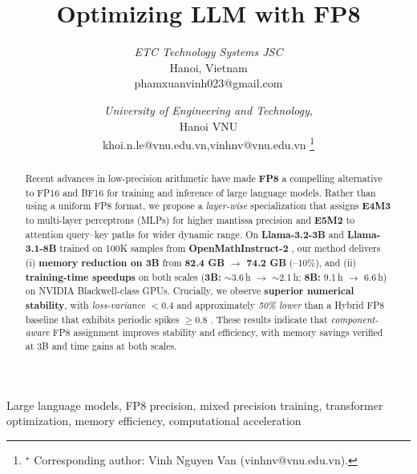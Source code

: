 \documentclass[conference]{IEEEtran}
\begin{document}
\title{Optimizing LLM with FP8}

\author{
\textit{ETC Technology Systems JSC}\\
Hanoi, Vietnam \\
phamxuanvinh023@gmail.com
\and
{}
\textit{University of Engineering and Technology, }\\
Hanoi VNU\\
khoi.n.le@vnu.edu.vn,vinhnv@vnu.edu.vn
\thanks{$^\star$ Corresponding author: Vinh Nguyen Van (vinhnv@vnu.edu.vn).}
}


\maketitle

\begin{abstract}
Recent advances in low-precision arithmetic have made \textbf{FP8} \cite{micikevicius2022fp8formatsdeeplearning} a compelling alternative to FP16 and BF16 for training and inference of large language models. Rather than using a uniform FP8 format, we propose a \emph{layer-wise} specialization that assigns \textbf{E4M3} to multi-layer perceptrons (MLPs) for higher mantissa precision and \textbf{E5M2} to attention query–key paths for wider dynamic range. On \textbf{Llama-3.2-3B} and \textbf{Llama-3.1-8B} trained on 100K samples from \textbf{OpenMathInstruct-2} \cite{toshniwal2024openmath2}, our method delivers (i) \textbf{memory reduction on 3B} from \textbf{82.4 GB $\to$ 74.2 GB} (–10\%), and (ii) \textbf{training-time speedups} on both scales (\textbf{3B:} $\sim$3.6\,h $\to$ $\sim$2.1\,h; \textbf{8B:} 9.1\,h $\to$ 6.6\,h) on NVIDIA Blackwell-class GPUs. Crucially, we observe \textbf{superior numerical stability}, with \emph{loss-variance $< 0.4$} and approximately \emph{50\% lower} than a Hybrid FP8 baseline that exhibits periodic spikes $\ge 0.8$ \cite{TE2025,nvidia2024mxfp8}. These results indicate that \emph{component-aware} FP8 assignment improves stability and efficiency, with memory savings verified at 3B and time gains at both scales.
\end{abstract}

\begin{IEEEkeywords}
Large language models, FP8 precision, mixed precision training, transformer optimization, memory efficiency, computational acceleration
\end{IEEEkeywords}
\end{document}

